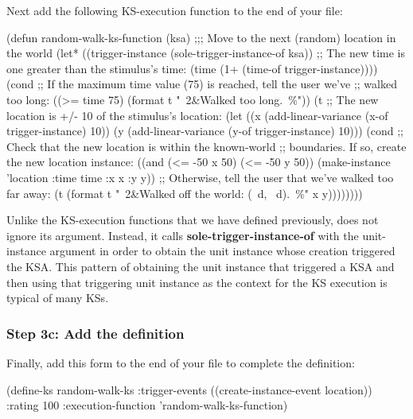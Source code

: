 \documentclass[10pt,twoside,english,pdftex]{article}
\begin{document}
Next add the following KS-execution function to the end of your
 file:
%
\W\supp
\begin{example}
  (defun random-walk-ks-function (ksa)
    ;;; Move to the next (random) location in the world
    (let* ((trigger-instance (sole-trigger-instance-of ksa))
           ;; The new time is one greater than the stimulus's time:
           (time (1+ (time-of trigger-instance))))
      (cond
       ;; If the maximum time value (75) is reached, tell the user we've
       ;; walked too long:
       ((>= time 75) (format t "~2&Walked too long.~\%"))
       (t ;; The new location is +/- 10 of the stimulus's location:
        (let ((x (add-linear-variance (x-of trigger-instance) 10))
              (y (add-linear-variance (y-of trigger-instance) 10)))
          (cond
           ;; Check that the new location is within the known-world
           ;; boundaries.  If so, create the new location instance:
           ((and (<= -50 x 50) (<= -50 y 50))
            (make-instance 'location 
              :time time 
              :x x 
              :y y))
           ;; Otherwise, tell the user that we've walked too far away:
           (t (format t "~2\&Walked off the world: (~d, ~d).~\%" x y))))))))
\end{example}

%
%
Unlike the KS-execution functions that we have defined previously,
 does not ignore its  argument.
Instead, it calls \textbf{sole-trigger-instance-of} with the 
unit-instance argument in order to obtain the  unit instance
whose creation triggered the KSA.  This pattern of obtaining the unit instance
that triggered a KSA and then using that triggering unit instance as the
context for the KS execution is typical of many KSs. 

\subsubsection*{Step 3c: Add the  definition}

Finally, add this  form to the end of your
 file to complete the 
definition:
%
%
%
\W\supp
\begin{example}
  (define-ks random-walk-ks
     :trigger-events ((create-instance-event location))
     :rating 100
     :execution-function 'random-walk-ks-function)
\end{example}
\end{document}
